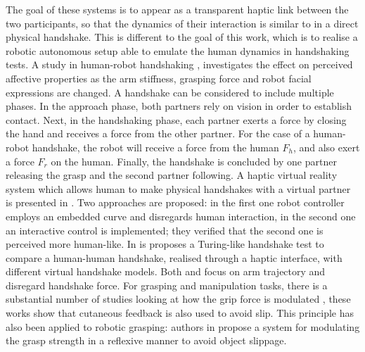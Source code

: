 The goal of these systems is to appear as a transparent haptic link between the two participants, so that the dynamics of their interaction is similar to in a direct physical handshake. This is different to the goal of this work, which is to realise a robotic autonomous setup able to emulate the human dynamics in handshaking tests.
%
A study in human-robot handshaking \cite{Tsalamlal2015}, investigates the effect on perceived affective properties as the arm stiffness, grasping force and robot facial expressions are changed. 
%
A handshake can be considered to include multiple phases. In the approach phase, both partners rely on vision in order to establish contact. Next, in the handshaking phase, each partner exerts a force by closing the hand and receives a force from the other partner. 
For the case of a human-robot handshake, the robot will receive a force from the human $F_{h}$, and also exert a force $F_{r}$ on the human. Finally, the handshake is concluded by one partner releasing the grasp and the second partner following.
%	
A haptic virtual reality system which allows human to make physical handshakes with a virtual partner is presented in \cite{wang2011handshake}. Two approaches are proposed: in the first one robot controller employs an embedded curve and disregards human interaction, in the second one an interactive control is implemented; they verified that the second one is perceived more human-like. 
In \cite{karniel2010turing} is proposes a Turing-like handshake test to compare a human-human handshake, realised through a haptic interface, with different virtual handshake models.
Both \cite{wang2011handshake} and  \cite{karniel2010turing} focus on arm trajectory and disregard handshake force. 
For grasping and manipulation tasks, there is a substantial number of studies looking at how the grip force is modulated \cite{johansson1992sensory, eliasson1995development, witney2004cutaneous}, these works show that cutaneous feedback is also used to avoid slip. 
%
This principle has also been applied to robotic grasping: authors in \cite{ajoudani2016reflex} propose a system for modulating the grasp strength in a reflexive manner to avoid object slippage.\\
%



